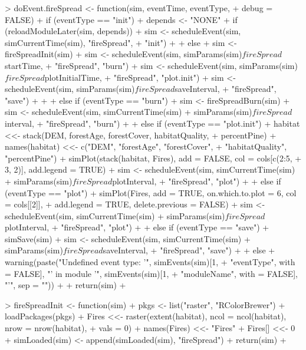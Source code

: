 \documentclass{article}
\begin{document}
\begin{Schunk}
\begin{Soutput}
> doEvent.fireSpread <- function(sim, eventTime, eventType, 
+     debug = FALSE) {
+     if (eventType == "init") {
+         depends <- "NONE"
+         if (reloadModuleLater(sim, depends)) {
+             sim <- scheduleEvent(sim, simCurrentTime(sim), "fireSpread", 
+                 "init")
+         }
+         else {
+             sim <- fireSpreadInit(sim)
+             sim <- scheduleEvent(sim, simParams(sim)$fireSpread$startTime, 
+                 "fireSpread", "burn")
+             sim <- scheduleEvent(sim, simParams(sim)$fireSpread$plotInitialTime, 
+                 "fireSpread", "plot.init")
+             sim <- scheduleEvent(sim, simParams(sim)$fireSpread$saveInterval, 
+                 "fireSpread", "save")
+         }
+     }
+     else if (eventType == "burn") {
+         sim <- fireSpreadBurn(sim)
+         sim <- scheduleEvent(sim, simCurrentTime(sim) + simParams(sim)$fireSpread$interval, 
+             "fireSpread", "burn")
+     }
+     else if (eventType == "plot.init") {
+         habitat <<- stack(DEM, forestAge, forestCover, habitatQuality, 
+             percentPine)
+         names(habitat) <<- c("DEM", "forestAge", "forestCover", 
+             "habitatQuality", "percentPine")
+         simPlot(stack(habitat, Fires), add = FALSE, col = cols[c(2:5, 
+             3, 2)], add.legend = TRUE)
+         sim <- scheduleEvent(sim, simCurrentTime(sim) + simParams(sim)$fireSpread$plotInterval, 
+             "fireSpread", "plot")
+     }
+     else if (eventType == "plot") {
+         simPlot(Fires, add = TRUE, on.which.to.plot = 6, col = cols[[2]], 
+             add.legend = TRUE, delete.previous = FALSE)
+         sim <- scheduleEvent(sim, simCurrentTime(sim) + simParams(sim)$fireSpread$plotInterval, 
+             "fireSpread", "plot")
+     }
+     else if (eventType == "save") {
+         simSave(sim)
+         sim <- scheduleEvent(sim, simCurrentTime(sim) + simParams(sim)$fireSpread$saveInterval, 
+             "fireSpread", "save")
+     }
+     else {
+         warning(paste("Undefined event type: '", simEvents(sim)[1, 
+             "eventType", with = FALSE], "' in module '", simEvents(sim)[1, 
+             "moduleName", with = FALSE], "'", sep = ""))
+     }
+     return(sim)
+ }

> fireSpreadInit <- function(sim) {
+     pkgs <- list("raster", "RColorBrewer")
+     loadPackages(pkgs)
+     Fires <<- raster(extent(habitat), ncol = ncol(habitat), nrow = nrow(habitat), 
+         vals = 0)
+     names(Fires) <<- "Fires"
+     Fires[] <<- 0
+     simLoaded(sim) <- append(simLoaded(sim), "fireSpread")
+     return(sim)
+ }


\end{Soutput}
\end{Schunk}
\end{document}

